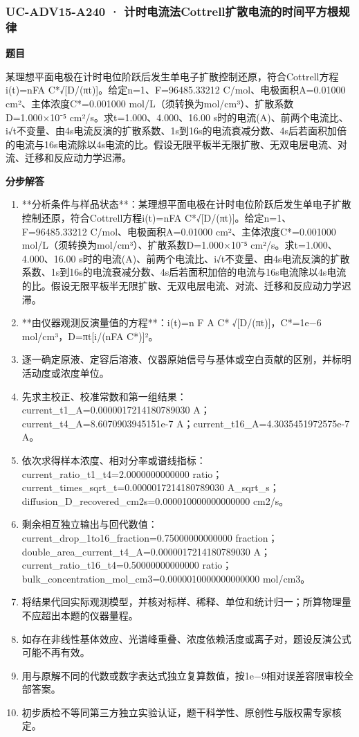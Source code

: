 \documentclass[UTF8,11pt,a4paper]{ctexart}
\begin{document}
\subsubsection*{UC-ADV15-A240 · 计时电流法Cottrell扩散电流的时间平方根规律}
\noindent\textbf{题目}\par
某理想平面电极在计时电位阶跃后发生单电子扩散控制还原，符合Cottrell方程i(t)=nFA C*√[D/(πt)]。给定n=1、F=96485.33212 C/mol、电极面积A=0.01000 cm²、主体浓度C*=0.001000 mol/L（须转换为mol/cm³）、扩散系数D=1.000×10⁻⁵ cm²/s。求t=1.000、4.000、16.00 s时的电流(A)、前两个电流比、i√t不变量、由4s电流反演的扩散系数、1s到16s的电流衰减分数、4s后若面积加倍的电流与16s电流除以4s电流的比。假设无限平板半无限扩散、无双电层电流、对流、迁移和反应动力学迟滞。\par
\medskip\noindent\textbf{分步解答}
\begin{enumerate}
\item **分析条件与样品状态**：某理想平面电极在计时电位阶跃后发生单电子扩散控制还原，符合Cottrell方程i(t)=nFA C*√[D/(πt)]。给定n=1、F=96485.33212 C/mol、电极面积A=0.01000 cm²、主体浓度C*=0.001000 mol/L（须转换为mol/cm³）、扩散系数D=1.000×10⁻⁵ cm²/s。求t=1.000、4.000、16.00 s时的电流(A)、前两个电流比、i√t不变量、由4s电流反演的扩散系数、1s到16s的电流衰减分数、4s后若面积加倍的电流与16s电流除以4s电流的比。假设无限平板半无限扩散、无双电层电流、对流、迁移和反应动力学迟滞。
\item **由仪器观测反演量值的方程**：i(t)=n F A C* √[D/(πt)]，C*=1e−6 mol/cm³，D=πt[i/(nFA C*)]²。
\item 逐一确定原液、定容后溶液、仪器原始信号与基体或空白贡献的区别，并标明活动度或浓度单位。
\item 先求主校正、校准常数和第一组结果：current\_t1\_A=0.0000017214180789030 A；current\_t4\_A=8.6070903945151e-7 A；current\_t16\_A=4.3035451972575e-7 A。
\item 依次求得样本浓度、相对分率或谱线指标：current\_ratio\_t1\_t4=2.0000000000000 ratio；current\_times\_sqrt\_t=0.0000017214180789030 A\_sqrt\_s；diffusion\_D\_recovered\_cm2s=0.000010000000000000 cm2/s。
\item 剩余相互独立输出与回代数值：current\_drop\_1to16\_fraction=0.75000000000000 fraction；double\_area\_current\_t4\_A=0.0000017214180789030 A；current\_ratio\_t16\_t4=0.50000000000000 ratio；bulk\_concentration\_mol\_cm3=0.0000010000000000000 mol/cm3。
\item 将结果代回实际观测模型，并核对标样、稀释、单位和统计归一；所算物理量不应超出本题的仪器量程。
\item 如存在非线性基体效应、光谱峰重叠、浓度依赖活度或离子对，题设反演公式可能不再有效。
\item 用与原解不同的代数或数字表达式独立复算数值，按1e−9相对误差容限审校全部答案。
\item 初步质检不等同第三方独立实验认证，题干科学性、原创性与版权需专家核定。
\end{enumerate}
\end{document}

